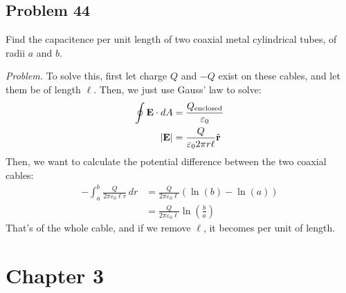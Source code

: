 \documentclass[10pt,oneside]{book}
\newcommand{\gspc}{\vspace{0.13cm}} %
\newenvironment{problem}[1]
  {\vspace{-0.1cm}\begin{tcolorbox}[problembox]
   \textit{Problem. }#1}
  {\end{tcolorbox}\gspc}
\newcommand{\cpr}[1]{\left(#1\right)}
\newcommand{\arhat}{\hat{\mathbf{r}}}
\begin{document}
\subsection*{Problem 44}
Find the capacitence per unit length of two coaxial metal cylindrical tubes, of radii $a$ and $b$. 
\begin{problem}
  To solve this, first let charge $Q$ and $-Q$ exist on these cables, and let them be of length $\ell$. Then, we just use Gauss' law to solve:
  \begin{align*}
    \oint \vE \cdot dA &= \frac{Q_\text{enclosed}}{\varepsilon_0}\\
    |\vE| &= \frac{Q}{\varepsilon_0 2\pi r\ell}\arhat
  \end{align*}
  Then, we want to calculate the potential difference between the two coaxial cables:
  \begin{align*}
    -\int_a^b \frac{Q}{2\pi\varepsilon_0\ell r}\, dr &= \frac{Q}{2\pi\varepsilon_0\ell}(\ln(b)-\ln(a))\\
    &= \frac{Q}{2\pi\varepsilon_0\ell}\ln\cpr{\frac{b}a}
  \end{align*}
  That's of the whole cable, and if we remove $\ell$, it becomes per unit of length. 
\end{problem}
\section*{Chapter 3}
\end{document}
